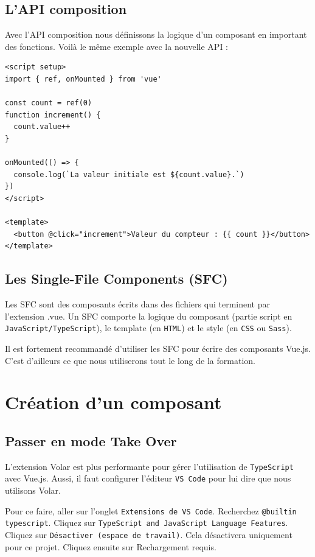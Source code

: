 \documentclass{article}
\begin{document}
\subsection{L'API composition}
Avec l'API composition nous définissons la logique d'un composant en important des fonctions. Voilà le même exemple avec la nouvelle API :
\begin{verbatim}
<script setup>
import { ref, onMounted } from 'vue'

const count = ref(0)
function increment() {
  count.value++
}

onMounted(() => {
  console.log(`La valeur initiale est ${count.value}.`)
})
</script>

<template>
  <button @click="increment">Valeur du compteur : {{ count }}</button>
</template>
\end{verbatim} 

\subsection{Les {\color{monOrange}Single-File Components} (SFC)}
Les SFC sont des composants écrits dans des fichiers qui terminent par l'extension {\color{monOrange}.vue}. Un SFC comporte la logique du composant (partie script en {\tt JavaScript/TypeScript}), le template (en {\tt HTML}) et le style (en {\tt CSS} ou {\tt Sass}).

Il est fortement recommandé d'utiliser les SFC pour écrire des composants {\color{monOrange}Vue.js}. C'est d'ailleurs ce que nous utiliserons tout le long de la formation.


\section{Création d'un composant}
\subsection{Passer en mode {\color{monOrange}Take Over}}
L'extension {\color{monOrange}Volar} est plus performante pour gérer l'utilisation de {\tt TypeScript} avec {\color{monOrange}Vue.js}. Aussi, il faut configurer l'éditeur {\tt VS Code} pour lui dire que nous utilisons {\color{monOrange}Volar}.

Pour ce faire, aller sur l'onglet {\tt Extensions de VS Code}. Recherchez {\tt @builtin typescript}. Cliquez sur {\tt TypeScript and JavaScript Language Features}. Cliquez sur {\tt Désactiver (espace de travail)}. Cela désactivera uniquement pour ce projet. Cliquez ensuite sur Rechargement requis.
\end{document}
